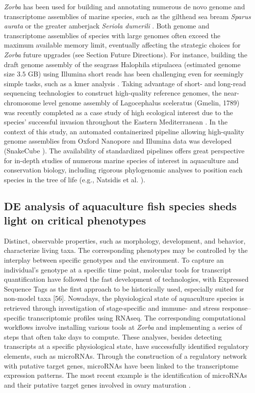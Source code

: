    \textit{Zorba} has been used for building and annotating numerous de novo genome and transcriptome assemblies of marine species, such as the gilthead sea bream \textit{Sparus aurata} \citep{pauletto2018genomic} or the greater amberjack \textit{Seriola dumerili} \citep{sarropoulou2017full}. 
   Both genome and transcriptome assemblies of species with large genomes often exceed the maximum available memory limit, eventually affecting the strategic choices for \textit{Zorba} future upgrades (see Section Future Directions). 
   For instance, building the draft genome assembly of the seagrass Halophila stipulacea (estimated genome size $3.5$ GB) using Illumina short reads has been challenging even for seemingly simple tasks, such as a kmer analysis \citep{tsakogiannis2020importance}. 
   Taking advantage of short- and long-read sequencing technologies to construct high-quality reference genomes, the near-chromosome level genome assembly of Lagocephalus sceleratus (Gmelin, 1789) was recently completed as a case study of high ecological interest due to the species' successful invasion throughout the Eastern Mediterranean \citep{danis2020building}. 
   In the context of this study, an automated containerized pipeline allowing high-quality genome assemblies from Oxford Nanopore and Illumina data was developed (SnakeCube \citep{nelina_angelova_2021_4670966}). 
   The availability of standardized pipelines offers great perspective for in-depth studies of numerous marine species of interest in aquaculture and conservation biology, including rigorous phylogenomic analyses to position each species in the tree of life (e.g., Natsidis et al. \citep{natsidis2019phylogenomics}).

   \subsection*{DE analysis of aquaculture fish species sheds light on critical phenotypes}

   Distinct, observable properties, such as morphology, development, and behavior, characterize living taxa. 
   The corresponding phenotypes may be controlled by the interplay between specific genotypes and the environment. 
   To capture an individual's genotype at a specific time point, molecular tools for transcript quantification have followed the fast development of technologies, with Expressed Sequence Tags as the first approach to be historically used, especially suited for non-model taxa [56]. 
   Nowadays, the physiological state of aquaculture species is retrieved through investigation of stage-specific and immune- and stress response–specific transcriptomic profiles using RNAseq. 
   The corresponding computational workflows involve installing various tools at \textit{Zorba} and implementing a series of steps that often take days to compute. 
   These analyses, besides detecting transcripts at a specific physiological state, have successfully identified regulatory elements, such as microRNAs. 
   Through the construction of a regulatory network with putative target genes, microRNAs have been linked to the transcriptome expression patterns. 
   The most recent example is the identification of microRNAs and their putative target genes involved in ovary maturation \citep{papadaki2020non}.

